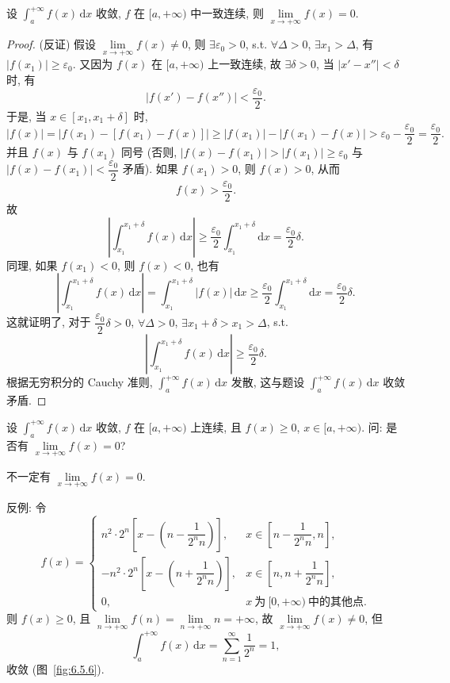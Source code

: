\begin{example}\label{ex:6.5.15}
设 $\int_{a}^{+\infty}f(x)\,\mathrm{d}x$ 收敛, $f$ 在 $[a,+\infty)$ 中一致连续, 则 $\lim\limits_{x\to+\infty}f(x)=0$.
\end{example}

\begin{proof}
(反证) 假设 $\lim\limits_{x\to+\infty}f(x)\neq0$, 则 $\exists\varepsilon_{0}>0$, s.t. $\forall\Delta>0$, $\exists x_{1}>\Delta$, 有 $|f(x_{1})|\geqslant\varepsilon_{0}$. 又因为 $f(x)$ 在 $[a,+\infty)$ 上一致连续, 故 $\exists\delta>0$, 当 $|x'-x''|<\delta$ 时, 有
\[
|f(x')-f(x'')|<\frac{\varepsilon_{0}}{2}.
\]
于是, 当 $x\in[x_{1},x_{1}+\delta]$ 时,
\[
|f(x)|=|f(x_{1})-[f(x_{1})-f(x)]|\geqslant|f(x_{1})|-|f(x_{1})-f(x)|>\varepsilon_{0}-\frac{\varepsilon_{0}}{2}=\frac{\varepsilon_{0}}{2}.
\]
并且 $f(x)$ 与 $f(x_{1})$ 同号 (否则, $|f(x)-f(x_{1})|>|f(x_{1})|\geqslant\varepsilon_{0}$ 与 $|f(x)-f(x_{1})|<\dfrac{\varepsilon_{0}}{2}$ 矛盾). 如果 $f(x_{1})>0$, 则 $f(x)>0$, 从而
\[
f(x)>\frac{\varepsilon_{0}}{2}.
\]
故
\[
\left|\int_{x_{1}}^{x_{1}+\delta}f(x)\,\mathrm{d}x\right|\geqslant\frac{\varepsilon_{0}}{2}\int_{x_{1}}^{x_{1}+\delta}\mathrm{d}x=\frac{\varepsilon_{0}}{2}\delta.
\]
同理, 如果 $f(x_{1})<0$, 则 $f(x)<0$, 也有
\[
\left|\int_{x_{1}}^{x_{1}+\delta}f(x)\,\mathrm{d}x\right|=\int_{x_{1}}^{x_{1}+\delta}|f(x)|\,\mathrm{d}x\geqslant\frac{\varepsilon_{0}}{2}\int_{x_{1}}^{x_{1}+\delta}\mathrm{d}x=\frac{\varepsilon_{0}}{2}\delta.
\]
这就证明了, 对于 $\dfrac{\varepsilon_{0}}{2}\delta>0$, $\forall\Delta>0$, $\exists x_{1}+\delta>x_{1}>\Delta$, s.t.
\[
\left|\int_{x_{1}}^{x_{1}+\delta}f(x)\,\mathrm{d}x\right|\geqslant\frac{\varepsilon_{0}}{2}\delta.
\]
根据无穷积分的 Cauchy 准则, $\int_{a}^{+\infty}f(x)\,\mathrm{d}x$ 发散, 这与题设 $\int_{a}^{+\infty}f(x)\,\mathrm{d}x$ 收敛矛盾.
\end{proof}

\begin{example}\label{ex:6.5.16}
设 $\int_{a}^{+\infty}f(x)\,\mathrm{d}x$ 收敛, $f$ 在 $[a,+\infty)$ 上连续, 且 $f(x)\geqslant0$, $x\in[a,+\infty)$. 问: 是否有 $\lim\limits_{x\to+\infty}f(x)=0$?
\end{example}

\begin{solution}
不一定有 $\lim\limits_{x\to+\infty}f(x)=0$.

反例: 令
\[
f(x)=\begin{cases}
n^{2}\cdot2^{n}\left[x-\left(n-\dfrac{1}{2^{n}n}\right)\right], & x\in\left[n-\dfrac{1}{2^{n}n},n\right],\\[3mm]
-n^{2}\cdot2^{n}\left[x-\left(n+\dfrac{1}{2^{n}n}\right)\right], & x\in\left[n,n+\dfrac{1}{2^{n}n}\right],\\[3mm]
0, & x\ \text{为}\ [0,+\infty)\ \text{中的其他点}.
\end{cases}
\]
则 $f(x)\geqslant0$, 且 $\lim\limits_{n\to+\infty}f(n)=\lim\limits_{n\to+\infty}n=+\infty$, 故 $\lim\limits_{x\to+\infty}f(x)\neq0$, 但
\[
\int_{a}^{+\infty}f(x)\,\mathrm{d}x=\sum_{n=1}^{\infty}\frac{1}{2^{n}}=1,
\]
收敛 (图~\ref{fig:6.5.6}).
\end{solution}

